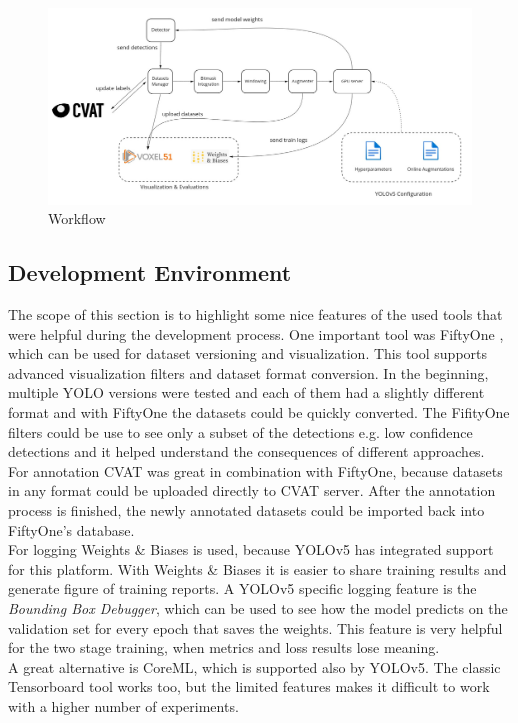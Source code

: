 \begin{figure}[!h]
  \centering
  \captionsetup{justification=centering,margin=2cm}
  \includegraphics[width=\columnwidth]{images/implementation/results/workflow}
  \caption{Workflow}
  \label{impl:workflow}
\end{figure}


\subsection{Development Environment}
The scope of this section is to highlight some nice features of the used tools that were helpful during the development process. One important tool was FiftyOne \cite{fiftyone_git}, which can be used for dataset versioning and visualization. This tool supports advanced visualization filters and dataset format conversion. In the beginning, multiple YOLO versions were tested and each of them had a slightly different format and with FiftyOne the datasets could be quickly converted. The FifityOne filters could be use to see only a subset of the detections e.g. low confidence detections and it helped understand the consequences of different approaches.  \\
For annotation CVAT was great in combination with FiftyOne, because datasets in any format could be uploaded directly to CVAT server. After the annotation process is finished, the newly annotated datasets could be imported back into FiftyOne's database. \\
For logging Weights \& Biases is used, because YOLOv5 has integrated support for this platform. With Weights \& Biases it is easier to share training results and generate figure of training reports. A YOLOv5 specific logging feature is the \textit{Bounding Box Debugger}, which can be used to see how the model predicts on the validation set for every epoch that saves the weights. This feature is very helpful for the two stage training, when metrics and loss results lose meaning. \\
A great alternative is CoreML, which is supported also by YOLOv5. The classic Tensorboard tool works too, but the limited features makes it difficult to work with a higher number of experiments. \\
